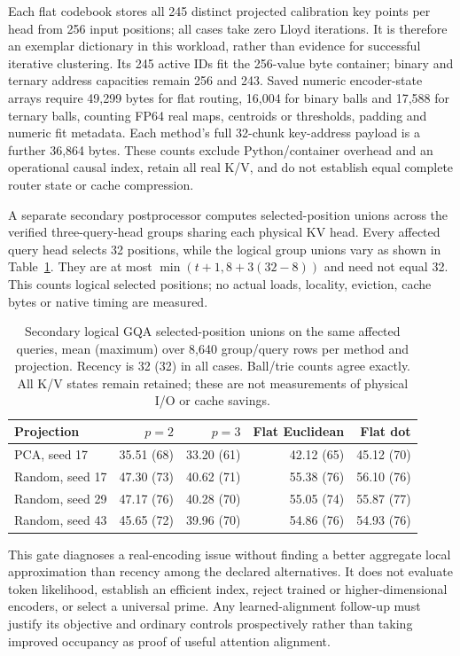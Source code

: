 \documentclass[11pt]{article}
\begin{document}
Each flat codebook stores all 245 distinct projected calibration key points
per head from 256 input positions; all cases take zero Lloyd iterations.
It is therefore an exemplar dictionary in this workload, rather than evidence
for successful iterative clustering. Its 245 active IDs fit the 256-value
byte container; binary and ternary address capacities remain 256 and 243.
Saved numeric encoder-state arrays require 49,299 bytes for flat routing,
16,004 for binary balls and 17,588 for ternary balls, counting FP64 real maps,
centroids or thresholds, padding and numeric fit metadata. Each method's full
32-chunk key-address payload is a further 36,864 bytes. These counts exclude
Python/container overhead and an operational causal index, retain all real K/V,
and do not establish equal complete router state or cache compression.

A separate secondary postprocessor computes selected-position unions across
the verified three-query-head groups sharing each physical KV head.
Every affected query head selects 32 positions, while the logical group unions
vary as shown in Table~\ref{tab:encoder-unions}. They are at most
\(\min(t+1,8+3(32-8))\) and need not equal 32. This counts logical selected
positions; no actual loads, locality, eviction, cache bytes or native timing
are measured.

\begin{table}[htbp]
\centering
\small
\caption{Secondary logical GQA selected-position unions on the same affected
queries, mean (maximum) over 8,640 group/query rows per method and projection.
Recency is 32 (32) in all cases. Ball/trie counts agree exactly. All K/V states
remain retained; these are not measurements of physical I/O or cache savings.}
\begin{tabular}{lrrrr}
\toprule
Projection & \(p=2\) & \(p=3\) & Flat Euclidean & Flat dot\\
\midrule
PCA, seed 17 & 35.51 (68) & 33.20 (61) & 42.12 (65) & 45.12 (70)\\
Random, seed 17 & 47.30 (73) & 40.62 (71) & 55.38 (76) & 56.10 (76)\\
Random, seed 29 & 47.17 (76) & 40.28 (70) & 55.05 (74) & 55.87 (77)\\
Random, seed 43 & 45.65 (72) & 39.96 (70) & 54.86 (76) & 54.93 (76)\\
\bottomrule
\end{tabular}
\label{tab:encoder-unions}
\end{table}

This gate diagnoses a real-encoding issue without finding a better aggregate
local approximation than recency among the declared alternatives. It does not
evaluate token likelihood, establish an efficient index, reject trained or
higher-dimensional encoders, or select a universal prime. Any learned-alignment
follow-up must justify its objective and ordinary controls prospectively rather
than taking improved occupancy as proof of useful attention alignment.
\end{document}
